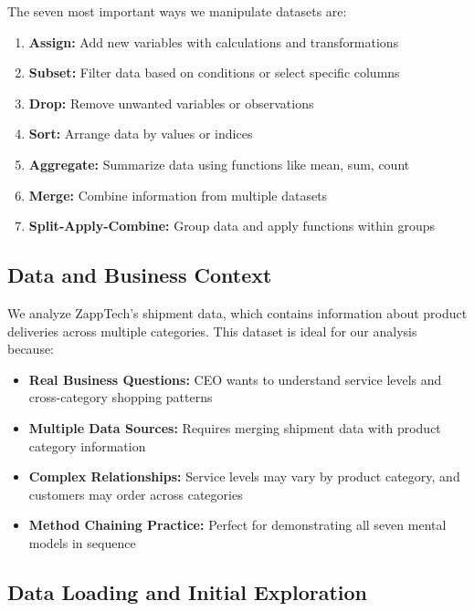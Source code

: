 \documentclass[
  letterpaper,
  DIV=11,
  numbers=noendperiod]{scrartcl}
\providecommand{\tightlist}{%
  \setlength{\itemsep}{0pt}\setlength{\parskip}{0pt}}
\begin{document}
The seven most important ways we manipulate datasets are:

\begin{enumerate}
\def\labelenumi{\arabic{enumi}.}
\tightlist
\item
  \textbf{Assign:} Add new variables with calculations and
  transformations
\item
  \textbf{Subset:} Filter data based on conditions or select specific
  columns
\item
  \textbf{Drop:} Remove unwanted variables or observations
\item
  \textbf{Sort:} Arrange data by values or indices
\item
  \textbf{Aggregate:} Summarize data using functions like mean, sum,
  count
\item
  \textbf{Merge:} Combine information from multiple datasets
\item
  \textbf{Split-Apply-Combine:} Group data and apply functions within
  groups
\end{enumerate}

\subsection{Data and Business Context}\label{data-and-business-context}

We analyze ZappTech's shipment data, which contains information about
product deliveries across multiple categories. This dataset is ideal for
our analysis because:

\begin{itemize}
\tightlist
\item
  \textbf{Real Business Questions:} CEO wants to understand service
  levels and cross-category shopping patterns
\item
  \textbf{Multiple Data Sources:} Requires merging shipment data with
  product category information
\item
  \textbf{Complex Relationships:} Service levels may vary by product
  category, and customers may order across categories
\item
  \textbf{Method Chaining Practice:} Perfect for demonstrating all seven
  mental models in sequence
\end{itemize}

\subsection{Data Loading and Initial
Exploration}\label{data-loading-and-initial-exploration}
\end{document}
